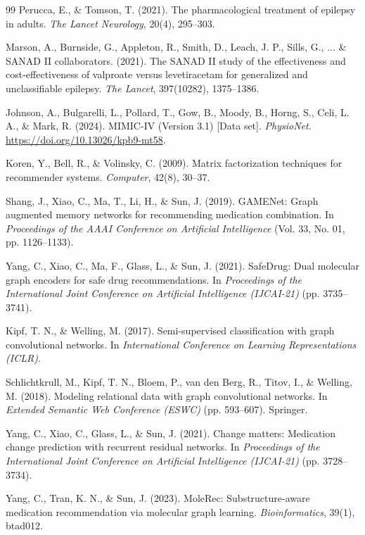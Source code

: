 \documentclass[11pt,a4paper]{article}
\begin{document}
\begin{table}[t]
\begin{thebibliography}{99}
Perucca, E., \& Tomson, T. (2021). The pharmacological treatment of epilepsy in adults. \emph{The Lancet Neurology}, 20(4), 295--303.

Marson, A., Burnside, G., Appleton, R., Smith, D., Leach, J. P., Sills, G., ... \& SANAD II collaborators. (2021). The SANAD II study of the effectiveness and cost-effectiveness of valproate versus levetiracetam for generalized and unclassifiable epilepsy. \emph{The Lancet}, 397(10282), 1375--1386.

Johnson, A., Bulgarelli, L., Pollard, T., Gow, B., Moody, B., Horng, S., Celi, L. A., \& Mark, R. (2024). MIMIC-IV (Version 3.1) [Data set]. \emph{PhysioNet}. \url{https://doi.org/10.13026/kpb9-mt58}.

Koren, Y., Bell, R., \& Volinsky, C. (2009). Matrix factorization techniques for recommender systems. \emph{Computer}, 42(8), 30--37.

Shang, J., Xiao, C., Ma, T., Li, H., \& Sun, J. (2019). GAMENet: Graph augmented memory networks for recommending medication combination. In \emph{Proceedings of the AAAI Conference on Artificial Intelligence} (Vol. 33, No. 01, pp. 1126--1133).

Yang, C., Xiao, C., Ma, F., Glass, L., \& Sun, J. (2021). SafeDrug: Dual molecular graph encoders for safe drug recommendations. In \emph{Proceedings of the International Joint Conference on Artificial Intelligence (IJCAI-21)} (pp. 3735--3741).

Kipf, T. N., \& Welling, M. (2017). Semi-supervised classification with graph convolutional networks. In \emph{International Conference on Learning Representations (ICLR)}.

Schlichtkrull, M., Kipf, T. N., Bloem, P., van den Berg, R., Titov, I., \& Welling, M. (2018). Modeling relational data with graph convolutional networks. In \emph{Extended Semantic Web Conference (ESWC)} (pp. 593--607). Springer.

Yang, C., Xiao, C., Glass, L., \& Sun, J. (2021). Change matters: Medication change prediction with recurrent residual networks. In \emph{Proceedings of the International Joint Conference on Artificial Intelligence (IJCAI-21)} (pp. 3728--3734).

Yang, C., Tran, K. N., \& Sun, J. (2023). MoleRec: Substructure-aware medication recommendation via molecular graph learning. \emph{Bioinformatics}, 39(1), btad012.


\end{thebibliography}
\end{table}
\end{document}
